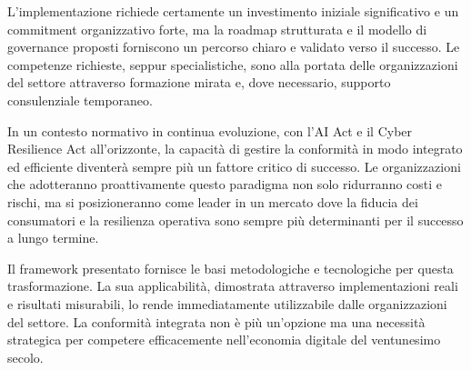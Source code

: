 L'implementazione richiede certamente un investimento iniziale significativo e un commitment organizzativo forte, ma la roadmap strutturata e il modello di governance proposti forniscono un percorso chiaro e validato verso il successo. Le competenze richieste, seppur specialistiche, sono alla portata delle organizzazioni del settore attraverso formazione mirata e, dove necessario, supporto consulenziale temporaneo.

In un contesto normativo in continua evoluzione, con l'AI Act e il Cyber Resilience Act all'orizzonte, la capacità di gestire la conformità in modo integrato ed efficiente diventerà sempre più un fattore critico di successo. Le organizzazioni che adotteranno proattivamente questo paradigma non solo ridurranno costi e rischi, ma si posizioneranno come leader in un mercato dove la fiducia dei consumatori e la resilienza operativa sono sempre più determinanti per il successo a lungo termine.

Il framework presentato fornisce le basi metodologiche e tecnologiche per questa trasformazione. La sua applicabilità, dimostrata attraverso implementazioni reali e risultati misurabili, lo rende immediatamente utilizzabile dalle organizzazioni del settore. La conformità integrata non è più un'opzione ma una necessità strategica per competere efficacemente nell'economia digitale del ventunesimo secolo.

\clearpage
\printbibliography[
    heading=subbibliography,
    title={Riferimenti Bibliografici del Capitolo 4},
]

